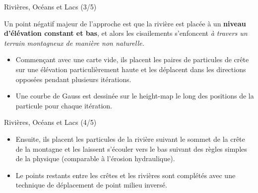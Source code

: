 \documentclass{beamer}
\begin{document}
\begin{frame}{Rivières, Océans et Lacs (3/5)}

Un point négatif majeur de l'approche est que la rivière est placée à un \textbf{niveau d'élévation constant et bas}, et alors les cisailements s'enfoncent \textit{à travers un terrain montagneux de manière non naturelle.} \newline


\begin{itemize}
	\item <3-> Commençant avec une carte vide, ils placent les paires de particules de crête sur une élévation particulièrement haute et les déplacent dans les directions opposées pendant plusieurs itérations.
	\item <4-> Une courbe de Gauss est dessinée sur le height-map le long des positions de la particule pour chaque itération.
\end{itemize}

\end{frame}
\begin{frame}{Rivières, Océans et Lacs (4/5)}

\begin{itemize}
	\item Ensuite, ils placent les particules de la rivière suivant le sommet de la crête de la montagne et les laissent s'écouler vers le bas suivant des règles simples de la physique (comparable à l'érosion hydraulique).
	\item <2-> Le points restants entre les crêtes et les rivières sont complétés avec une technique de déplacement de point milieu inversé.
\end{itemize}

 \newline

\end{frame}
\end{document}
